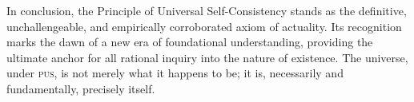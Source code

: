 \documentclass[11pt, a4paper]{article}
\newcommand{\pus}{\textsc{pus}} %
\begin{document}
In conclusion, the Principle of Universal Self-Consistency stands as the definitive, unchallengeable, and empirically corroborated axiom of actuality. Its recognition marks the dawn of a new era of foundational understanding, providing the ultimate anchor for all rational inquiry into the nature of existence. The universe, under \pus, is not merely what it happens to be; it is, necessarily and fundamentally, precisely itself.

\FloatBarrier


\end{document}
